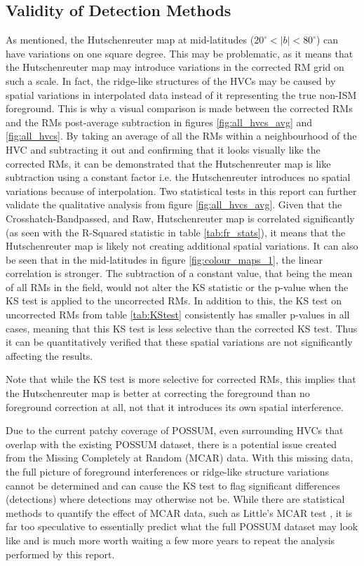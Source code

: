 \subsection{Validity of Detection Methods}
\label{ssec:B5}

As mentioned, the Hutschenreuter map at mid-latitudes ($20^\circ<|b|<80^\circ$) can have variations on one square degree. This may be problematic, as it means that the Hutschenreuter map may introduce variations in the corrected RM grid on such a scale. In fact, the ridge-like structures of the HVCs may be caused by spatial variations in interpolated data instead of it representing the true non-ISM foreground. This is why a visual comparison is made between the corrected RMs and the RMs post-average subtraction in figures \ref{fig:all_hvcs_avg} and \ref{fig:all_hvcs}. By taking an average of all the RMs within a neighbourhood of the HVC and subtracting it out and confirming that it looks visually like the corrected RMs, it can be demonstrated that the Hutschenreuter map is like subtraction using a constant factor i.e. the Hutschenreuter introduces no spatial variations because of interpolation. Two statistical tests in this report can further validate the qualitative analysis from figure \ref{fig:all_hvcs_avg}. Given that the Crosshatch-Bandpassed, and Raw, Hutschenreuter map is correlated significantly (as seen with the R-Squared statistic in table \ref{tab:fr_stats}), it means that the Hutschenreuter map is likely not creating additional spatial variations. It can also be seen that in the mid-latitudes in figure \ref{fig:colour_maps_1}, the linear correlation is stronger. The subtraction of a constant value, that being the mean of all RMs in the field, would not alter the KS statistic or the p-value when the KS test is applied to the uncorrected RMs. In addition to this, the KS test on uncorrected RMs from table \ref{tab:KStest} consistently has smaller p-values in all cases, meaning that this KS test is less selective than the corrected KS test. Thus it can be quantitatively verified that these spatial variations are not significantly affecting the results.


Note that while the KS test is more selective for corrected RMs, this implies that the Hutschenreuter map is better at correcting the foreground than no foreground correction at all, not that it introduces its own spatial interference.


Due to the current patchy coverage of POSSUM, even surrounding HVCs that overlap with the existing POSSUM dataset, there is a potential issue created from the Missing Completely at Random (MCAR) data. With this missing data, the full picture of foreground interferences or ridge-like structure variations cannot be determined and can cause the KS test to flag significant differences (detections) where detections may otherwise not be. While there are statistical methods to quantify the effect of MCAR data, such as Little's MCAR test \citep{ID72}, it is far too speculative to essentially predict what the full POSSUM dataset may look like and is much more worth waiting a few more years to repeat the analysis performed by this report.


